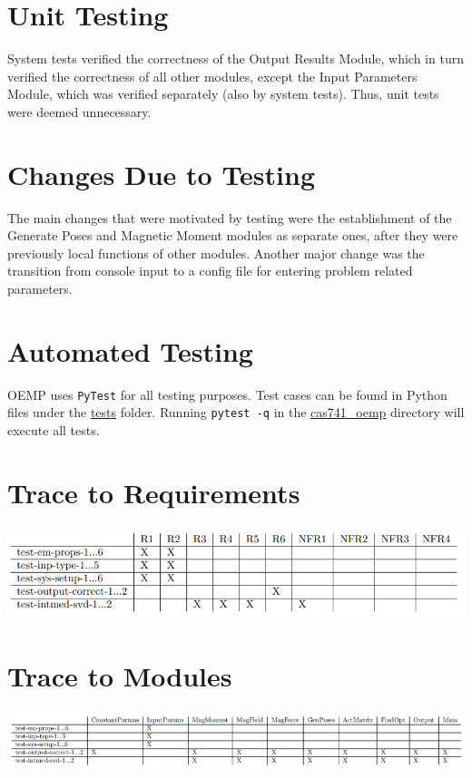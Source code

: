 \documentclass[12pt, titlepage]{article}
\begin{document}
\section{Unit Testing}
System tests verified the correctness of the Output Results Module, which in turn verified the correctness of all other modules, except the Input Parameters Module, which was verified separately (also by system tests). Thus, unit tests were deemed unnecessary. 

\section{Changes Due to Testing}
The main changes that were motivated by testing were the establishment of the Generate Poses and Magnetic Moment modules as separate ones, after they were previously local functions of other modules. Another major change was the transition from console input to a config file for entering problem related parameters.  

\section{Automated Testing}
OEMP uses \texttt{PyTest} for all testing purposes. Test cases can be found in Python files under the \href{https://github.com/husseinsd1/optimal-em-arrangement/tree/main/cas741-oemp/cas741_oemp/tests}{tests} folder. Running \texttt{pytest -q} in the \href{https://github.com/husseinsd1/optimal-em-arrangement/tree/main/cas741-oemp/cas741_oemp}{cas741\_oemp} directory will execute all tests. 

\section{Trace to Requirements}
\begin{center}
  \includegraphics[scale=0.7]{TraceReq.PNG} \\
  \label{tracereq}
\end{center}
\newpage
\section{Trace to Modules}		
\begin{center}
  \includegraphics[scale=0.7]{TraceMod.PNG} \\
  \label{tracemod}
\end{center}
\end{document}
